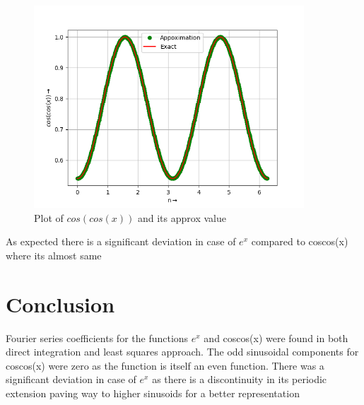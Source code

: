 \documentclass[10pt,a4paper]{article}
\begin{document}
\begin{figure}[!tbh]
\includegraphics[width = 0.9\textwidth]{7b.png}
\caption{Plot of $cos(cos(x))$ and its approx value}
\end{figure} 


As expected there is a significant deviation in case of $e^{x}$ compared to coscos(x) where its almost same
\newline
\newline
\newline
\newline


\section{Conclusion}
Fourier series coefficients for the functions $e^{x}$ and coscos(x) were found in both direct integration and least squares approach.
The odd sinusoidal components for coscos(x) were zero as the function is itself an even function. 
There was a significant deviation in case of $e^{x}$ as there is a discontinuity in its periodic extension paving way to higher sinusoids for a better representation
\end{document}
